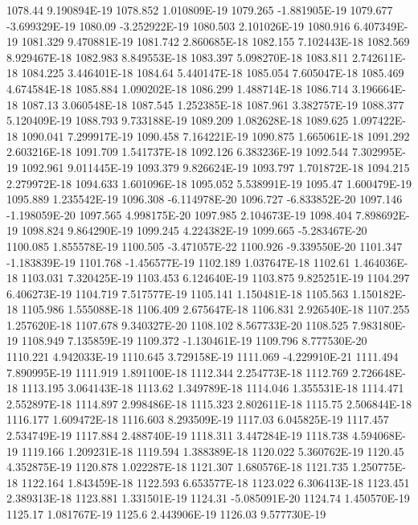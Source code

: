 1078.44  9.190894E-19
1078.852  1.010809E-19
1079.265  -1.881905E-19
1079.677  -3.699329E-19
1080.09  -3.252922E-19
1080.503  2.101026E-19
1080.916  6.407349E-19
1081.329  9.470881E-19
1081.742  2.860685E-18
1082.155  7.102443E-18
1082.569  8.929467E-18
1082.983  8.849553E-18
1083.397  5.098270E-18
1083.811  2.742611E-18
1084.225  3.446401E-18
1084.64  5.440147E-18
1085.054  7.605047E-18
1085.469  4.674584E-18
1085.884  1.090202E-18
1086.299  1.488714E-18
1086.714  3.196664E-18
1087.13  3.060548E-18
1087.545  1.252385E-18
1087.961  3.382757E-19
1088.377  5.120409E-19
1088.793  9.733188E-19
1089.209  1.082628E-18
1089.625  1.097422E-18
1090.041  7.299917E-19
1090.458  7.164221E-19
1090.875  1.665061E-18
1091.292  2.603216E-18
1091.709  1.541737E-18
1092.126  6.383236E-19
1092.544  7.302995E-19
1092.961  9.011445E-19
1093.379  9.826624E-19
1093.797  1.701872E-18
1094.215  2.279972E-18
1094.633  1.601096E-18
1095.052  5.538991E-19
1095.47  1.600479E-19
1095.889  1.235542E-19
1096.308  -6.114978E-20
1096.727  -6.833852E-20
1097.146  -1.198059E-20
1097.565  4.998175E-20
1097.985  2.104673E-19
1098.404  7.898692E-19
1098.824  9.864290E-19
1099.245  4.224382E-19
1099.665  -5.283467E-20
1100.085  1.855578E-19
1100.505  -3.471057E-22
1100.926  -9.339550E-20
1101.347  -1.183839E-19
1101.768  -1.456577E-19
1102.189  1.037647E-18
1102.61  1.464036E-18
1103.031  7.320425E-19
1103.453  6.124640E-19
1103.875  9.825251E-19
1104.297  6.406273E-19
1104.719  7.517577E-19
1105.141  1.150481E-18
1105.563  1.150182E-18
1105.986  1.555088E-18
1106.409  2.675647E-18
1106.831  2.926540E-18
1107.255  1.257620E-18
1107.678  9.340327E-20
1108.102  8.567733E-20
1108.525  7.983180E-19
1108.949  7.135859E-19
1109.372  -1.130461E-19
1109.796  8.777530E-20
1110.221  4.942033E-19
1110.645  3.729158E-19
1111.069  -4.229910E-21
1111.494  7.890995E-19
1111.919  1.891100E-18
1112.344  2.254773E-18
1112.769  2.726648E-18
1113.195  3.064143E-18
1113.62  1.349789E-18
1114.046  1.355531E-18
1114.471  2.552897E-18
1114.897  2.998486E-18
1115.323  2.802611E-18
1115.75  2.506844E-18
1116.177  1.609472E-18
1116.603  8.293509E-19
1117.03  6.045825E-19
1117.457  2.534749E-19
1117.884  2.488740E-19
1118.311  3.447284E-19
1118.738  4.594068E-19
1119.166  1.209231E-18
1119.594  1.388389E-18
1120.022  5.360762E-19
1120.45  4.352875E-19
1120.878  1.022287E-18
1121.307  1.680576E-18
1121.735  1.250775E-18
1122.164  1.843459E-18
1122.593  6.653577E-18
1123.022  6.306413E-18
1123.451  2.389313E-18
1123.881  1.331501E-19
1124.31  -5.085091E-20
1124.74  1.450570E-19
1125.17  1.081767E-19
1125.6  2.443906E-19
1126.03  9.577730E-19
